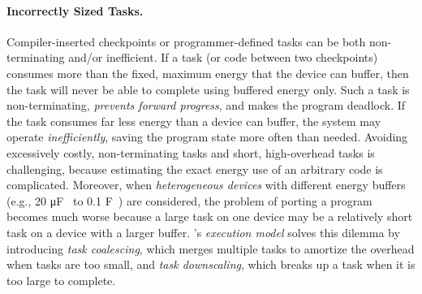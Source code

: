 \paragraph{Incorrectly Sized Tasks.}
Compiler-inserted checkpoints or programmer-defined tasks can be both non-terminating and/or inefficient.  If a task (or code between two checkpoints) consumes more than the fixed, maximum energy that the device can buffer, then the task will never be able to complete using buffered energy only.  Such a task is non-terminating, {\em prevents forward progress}, and makes the program deadlock. If the task consumes far less energy than a device can buffer, the system may operate {\em inefficiently}, saving the program state more often than needed. Avoiding excessively costly, non-terminating tasks and short, high-overhead tasks is challenging, because estimating the exact energy use of an arbitrary code is complicated. Moreover, when \emph{heterogeneous devices} with different energy buffers (e.g., 20 \si{\micro\farad}~\cite{rodriguez_tbcs_2015} to 0.1 \si{\farad}~\cite{moo}) are considered, the problem of porting a program becomes much worse because a large task on one device may be a relatively short task on a device with a larger buffer. \sys's \emph{execution model} solves this dilemma by introducing {\em task coalescing}, which merges multiple tasks to amortize the overhead when tasks are too small, and {\em task downscaling}, which breaks up a task when it is too large to complete. 
